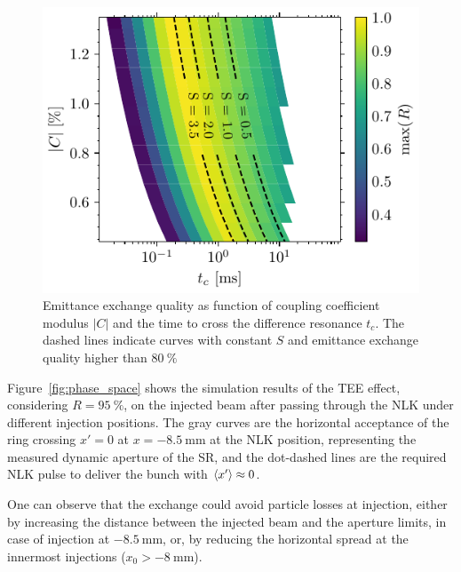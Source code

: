\documentclass[a4paper,
               keeplastbox,   %
              nospread,     %
               ]{jacow}
\begin{document}
\begin{figure}%
    \centering
    \includegraphics[width=0.85\linewidth]{THPOPT056_f1.pdf}
    \caption{Emittance exchange quality as function of coupling coefficient modulus $|C|$ and the time to cross the difference resonance $t_c$. The dashed lines indicate curves with constant $S$ and emittance exchange quality higher than $\SI{80}{\%}$}
    \label{fig:r_map}
\end{figure}

Figure~\ref{fig:phase_space} shows the simulation results of the TEE effect, considering $R=\SI{95}{\%}$, on the injected beam after passing through the NLK under different injection positions. %
The gray curves are the horizontal acceptance of the ring crossing $x'=0$ at $x = \SI{-8.5}{\milli \meter}$ at the NLK position, representing the measured dynamic aperture of the SR, and the dot-dashed lines are the required NLK pulse to deliver the bunch with $\expval{x'} \approx 0$.

One can observe that the exchange could avoid particle losses at injection, %
either by increasing the distance between the injected beam and the aperture limits, in case of injection at $\SI{-8.5}{\milli \meter}$, or, by reducing the horizontal spread at the innermost injections ($x_0 > \SI{-8}{\milli \meter}$). %
 
\end{document}
